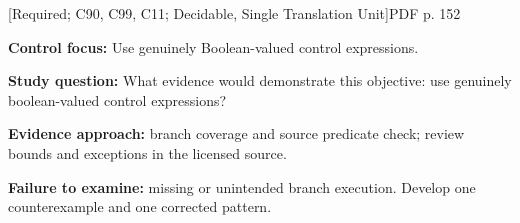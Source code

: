\documentclass[10pt,letterpaper]{article}
\begin{document}
\smallskip
{}
 \textsf{\footnotesize [Required; C90, C99, C11; Decidable, Single Translation Unit]}\hfill{\footnotesize PDF p. 152}\par
\textbf{Control focus:} Use genuinely Boolean-valued control expressions.\par
\textbf{Study question:} What evidence would demonstrate this objective: use genuinely boolean-valued control expressions?\par
\textbf{Evidence approach:} branch coverage and source predicate check; review bounds and exceptions in the licensed source.\par
\textbf{Failure to examine:} missing or unintended branch execution. Develop one counterexample and one corrected pattern.\par
\smallskip
\end{document}
